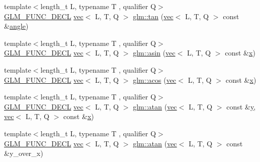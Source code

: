 \begin{DoxyCompactItemize}
\item 
{\footnotesize template$<$length\+\_\+t L, typename T , qualifier Q$>$ }\\\mbox{\hyperlink{setup_8hpp_ab2d052de21a70539923e9bcbf6e83a51}{G\+L\+M\+\_\+\+F\+U\+N\+C\+\_\+\+D\+E\+CL}} \mbox{\hyperlink{structglm_1_1vec}{vec}}$<$ L, T, Q $>$ \mbox{\hyperlink{group__core__func__trigonometric_ga293a34cfb9f0115cc606b4a97c84f11f}{glm\+::tan}} (\mbox{\hyperlink{structglm_1_1vec}{vec}}$<$ L, T, Q $>$ const \&\mbox{\hyperlink{_s_d_l__opengl__glext_8h_a9e06c1f76a20fed54ca742cd25cb02c4}{angle}})
\item 
{\footnotesize template$<$length\+\_\+t L, typename T , qualifier Q$>$ }\\\mbox{\hyperlink{setup_8hpp_ab2d052de21a70539923e9bcbf6e83a51}{G\+L\+M\+\_\+\+F\+U\+N\+C\+\_\+\+D\+E\+CL}} \mbox{\hyperlink{structglm_1_1vec}{vec}}$<$ L, T, Q $>$ \mbox{\hyperlink{group__core__func__trigonometric_ga0552d2df4865fa8c3d7cfc3ec2caac73}{glm\+::asin}} (\mbox{\hyperlink{structglm_1_1vec}{vec}}$<$ L, T, Q $>$ const \&\mbox{\hyperlink{_s_d_l__opengl_8h_ad0e63d0edcdbd3d79554076bf309fd47}{x}})
\item 
{\footnotesize template$<$length\+\_\+t L, typename T , qualifier Q$>$ }\\\mbox{\hyperlink{setup_8hpp_ab2d052de21a70539923e9bcbf6e83a51}{G\+L\+M\+\_\+\+F\+U\+N\+C\+\_\+\+D\+E\+CL}} \mbox{\hyperlink{structglm_1_1vec}{vec}}$<$ L, T, Q $>$ \mbox{\hyperlink{group__core__func__trigonometric_gacc9b092df8257c68f19c9053703e2563}{glm\+::acos}} (\mbox{\hyperlink{structglm_1_1vec}{vec}}$<$ L, T, Q $>$ const \&\mbox{\hyperlink{_s_d_l__opengl_8h_ad0e63d0edcdbd3d79554076bf309fd47}{x}})
\item 
{\footnotesize template$<$length\+\_\+t L, typename T , qualifier Q$>$ }\\\mbox{\hyperlink{setup_8hpp_ab2d052de21a70539923e9bcbf6e83a51}{G\+L\+M\+\_\+\+F\+U\+N\+C\+\_\+\+D\+E\+CL}} \mbox{\hyperlink{structglm_1_1vec}{vec}}$<$ L, T, Q $>$ \mbox{\hyperlink{group__core__func__trigonometric_gac61629f3a4aa14057e7a8cae002291db}{glm\+::atan}} (\mbox{\hyperlink{structglm_1_1vec}{vec}}$<$ L, T, Q $>$ const \&\mbox{\hyperlink{_s_d_l__opengl_8h_a1675d9d7bb68e1657ff028643b4037e3}{y}}, \mbox{\hyperlink{structglm_1_1vec}{vec}}$<$ L, T, Q $>$ const \&\mbox{\hyperlink{_s_d_l__opengl_8h_ad0e63d0edcdbd3d79554076bf309fd47}{x}})
\item 
{\footnotesize template$<$length\+\_\+t L, typename T , qualifier Q$>$ }\\\mbox{\hyperlink{setup_8hpp_ab2d052de21a70539923e9bcbf6e83a51}{G\+L\+M\+\_\+\+F\+U\+N\+C\+\_\+\+D\+E\+CL}} \mbox{\hyperlink{structglm_1_1vec}{vec}}$<$ L, T, Q $>$ \mbox{\hyperlink{group__core__func__trigonometric_ga5229f087eaccbc466f1c609ce3107b95}{glm\+::atan}} (\mbox{\hyperlink{structglm_1_1vec}{vec}}$<$ L, T, Q $>$ const \&y\+\_\+over\+\_\+x)

\end{DoxyCompactItemize}
